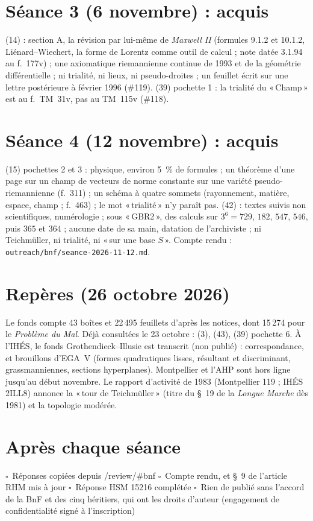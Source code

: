 \documentclass[10pt,a4paper]{article}
\newcommand{\cb}{$\square$}
\newcommand{\q}[1]{«\,#1\,»}
\begin{document}
\section*{Séance 3 (6 novembre) : acquis}
{\small (14) : section A, la révision par lui-même de \emph{Maxwell II} (formules 9.1.2 et 10.1.2, Liénard--Wiechert, la forme de Lorentz comme outil de calcul ; note datée 3.1.94 au f.~177v) ; une axiomatique riemannienne continue de 1993 et de la géométrie différentielle ; ni trialité, ni lieux, ni pseudo-droites ; un feuillet écrit sur une lettre postérieure à février 1996 (\#119). (39) pochette 1 : la trialité du \q{Champ} est au f.~TM~31v, pas au TM~115v (\#118).\par}

\section*{Séance 4 (12 novembre) : acquis}
{\small (15) pochettes 2 et 3 : physique, environ 5~\% de formules ; un théorème d'une page sur un champ de vecteurs de norme constante sur une variété pseudo-riemannienne (f.~311) ; un schéma à quatre sommets (rayonnement, matière, espace, champ ; f.~463) ; le mot \q{trialité} n'y paraît pas. (42) : textes suivis non scientifiques, numérologie ; sous \q{GBR2}, des calculs sur $3^6 = 729$, $182$, $547$, $546$, puis $365$ et $364$ ; aucune date de sa main, datation de l'archiviste ; ni Teichmüller, ni trialité, ni \q{sur une base $S$}. Compte rendu : \texttt{outreach/bnf/seance-2026-11-12.md}.\par}

\section*{Repères (26 octobre 2026)}
{\small Le fonds compte 43 boîtes et 22\,495 feuillets d'après les notices, dont 15\,274 pour le \emph{Problème du Mal}. Déjà consultées le 23 octobre : (3), (43), (39) pochette 6. À l'IHÉS, le fonds Grothendieck--Illusie est transcrit (non publié) : correspondance, et brouillons d'EGA~V (formes quadratiques lisses, résultant et discriminant, grassmanniennes, sections hyperplanes). Montpellier et l'AHP sont hors ligne jusqu'au début novembre. Le rapport d'activité de 1983 (Montpellier 119 ; IHÉS 2ILL8) annonce la \q{tour de Teichmüller} (titre du §~19 de la \emph{Longue Marche} dès 1981) et la topologie modérée.}

\section*{Après chaque séance}
\cb\ Réponses copiées depuis /review/\#bnf \quad \cb\ Compte rendu, et §~9 de l'article RHM mis à jour \quad \cb\ Réponse HSM 15216 complétée \quad \cb\ Rien de publié sans l'accord de la BnF et des cinq héritiers, qui ont les droits d'auteur (engagement de confidentialité signé à l'inscription)
\end{document}
